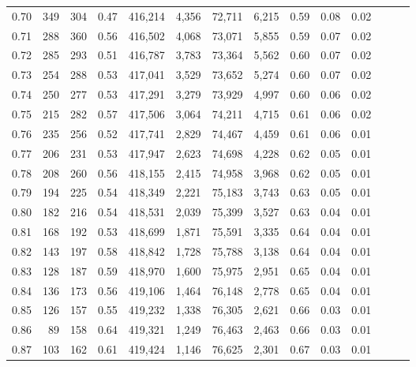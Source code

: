 \begin{tabular}{rrrrrrrrrrrrrr}
0.70 &     349 &    304 &  0.47 &  416,214 &    4,356 &  72,711 &   6,215 &  0.59 &  0.08 &      0.02 \\
0.71 &     288 &    360 &  0.56 &  416,502 &    4,068 &  73,071 &   5,855 &  0.59 &  0.07 &      0.02 \\
0.72 &     285 &    293 &  0.51 &  416,787 &    3,783 &  73,364 &   5,562 &  0.60 &  0.07 &      0.02 \\
0.73 &     254 &    288 &  0.53 &  417,041 &    3,529 &  73,652 &   5,274 &  0.60 &  0.07 &      0.02 \\
0.74 &     250 &    277 &  0.53 &  417,291 &    3,279 &  73,929 &   4,997 &  0.60 &  0.06 &      0.02 \\
0.75 &     215 &    282 &  0.57 &  417,506 &    3,064 &  74,211 &   4,715 &  0.61 &  0.06 &      0.02 \\
0.76 &     235 &    256 &  0.52 &  417,741 &    2,829 &  74,467 &   4,459 &  0.61 &  0.06 &      0.01 \\
0.77 &     206 &    231 &  0.53 &  417,947 &    2,623 &  74,698 &   4,228 &  0.62 &  0.05 &      0.01 \\
0.78 &     208 &    260 &  0.56 &  418,155 &    2,415 &  74,958 &   3,968 &  0.62 &  0.05 &      0.01 \\
0.79 &     194 &    225 &  0.54 &  418,349 &    2,221 &  75,183 &   3,743 &  0.63 &  0.05 &      0.01 \\
0.80 &     182 &    216 &  0.54 &  418,531 &    2,039 &  75,399 &   3,527 &  0.63 &  0.04 &      0.01 \\
0.81 &     168 &    192 &  0.53 &  418,699 &    1,871 &  75,591 &   3,335 &  0.64 &  0.04 &      0.01 \\
0.82 &     143 &    197 &  0.58 &  418,842 &    1,728 &  75,788 &   3,138 &  0.64 &  0.04 &      0.01 \\
0.83 &     128 &    187 &  0.59 &  418,970 &    1,600 &  75,975 &   2,951 &  0.65 &  0.04 &      0.01 \\
0.84 &     136 &    173 &  0.56 &  419,106 &    1,464 &  76,148 &   2,778 &  0.65 &  0.04 &      0.01 \\
0.85 &     126 &    157 &  0.55 &  419,232 &    1,338 &  76,305 &   2,621 &  0.66 &  0.03 &      0.01 \\
0.86 &      89 &    158 &  0.64 &  419,321 &    1,249 &  76,463 &   2,463 &  0.66 &  0.03 &      0.01 \\
0.87 &     103 &    162 &  0.61 &  419,424 &    1,146 &  76,625 &   2,301 &  0.67 &  0.03 &      0.01 \\

\end{tabular}
